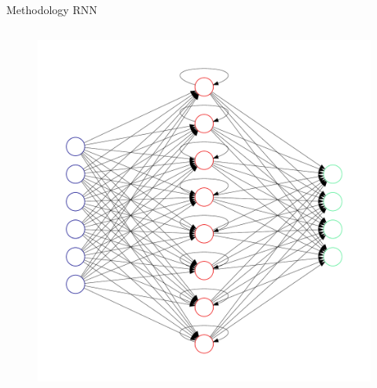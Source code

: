 \documentclass{beamer}
\begin{document}
\begin{frame}{Methodology RNN}
{\begin{columns}
\begin{column}{0.5\textwidth}
{                                        \begin{figure}
                                                \includegraphics[width=.8\linewidth]{images/rnn_net.pdf}
                                        \end{figure}
                                }
\end{column}
\end{columns}}
\end{frame}
\end{document}
